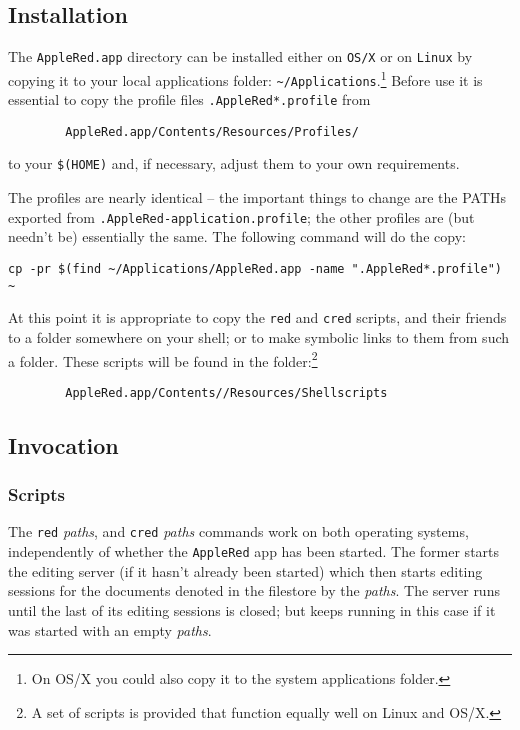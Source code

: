 \documentclass[12pt,a4paper]{article}
\begin{document}
\hypertarget{installation}{%
\subsection{Installation}\label{installation}}

The \texttt{AppleRed.app} directory can be installed either on
\texttt{OS/X} or on \texttt{Linux} by copying it to your local
applications folder: \texttt{\textasciitilde{}/Applications}.\footnote{On
OS/X you could also copy it to the system applications folder.}
Before use it is essential to copy the profile files \verb/.AppleRed*.profile/
from
\begin{verbatim}
        AppleRed.app/Contents/Resources/Profiles/
\end{verbatim}
to your \texttt{\$(HOME)} and, if necessary, adjust them to your
own requirements.

The profiles are nearly identical -- the important things to change are
the PATHs exported from \texttt{.AppleRed-application.profile}; the
other profiles are (but needn't be) essentially the same. The following
command will do the copy:

\begin{verbatim}
cp -pr $(find ~/Applications/AppleRed.app -name ".AppleRed*.profile") ~
\end{verbatim}

At this point it is appropriate   to copy the \texttt{red} and \texttt{cred} scripts, and
their friends to a folder somewhere on your shell; or to make symbolic links to them
from such a folder. These scripts will be found in the folder:\footnote{A set of scripts
is provided that function equally well on Linux and OS/X.}
\begin{verbatim}
        AppleRed.app/Contents//Resources/Shellscripts
\end{verbatim}

\subsection{Invocation}\label{invocation}
\subsubsection{Scripts}\label{scripts}

The \texttt{red} \emph{paths}, and \texttt{cred} \emph{paths}
commands work on both operating systems, independently of whether
the \texttt{AppleRed} app has been started. The former starts the
editing server (if it hasn't already been started) which then starts
editing sessions for the documents denoted in the filestore by the
\emph{paths}. The server runs until the last of its editing sessions
is closed; but keeps running in this case if it was started with
an empty \emph{paths}.
\end{document}
